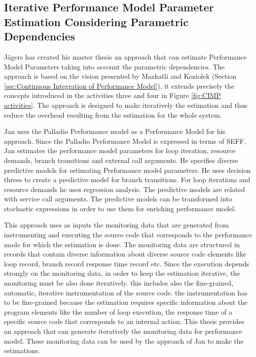 \subsection{Iterative Performance Model Parameter Estimation Considering Parametric Dependencies}
\label{sec:Iterative Performance Model Parameter Estimation Considering Parametric Dependencies}
Jägers has created his master thesis \cite{jagers2018Iterative} an approach that can estimate Performance Model Parameters taking into account the parametric dependencies. The approach is based on the vision presented by Mazkatli and Koziolek (Section \ref{sec:Continuous Integration of Performance Model}), it extends precisely the concepts introduced in the activities three and four in Figure \ref{fig:CIMP activities}. The approach is designed to make iteratively the estimation and thus reduce the overhead resulting from the estimation for the whole system. 

Jan uses the Palladio Performance model as a Performance Model for his approach. Since the Palladio Performance Model is expressed in terms of SEFF, Jan estimates the performance model parameters for loop iteration, resource demands, branch transitions and external call arguments. He specifies diverse predictive models for estimating Performance model parameters. He uses decision threes to create a predictive model for branch transitions. For loop iterations and resource demands he uses regression analysis. The predictive models are related with service call arguments. The predictive models can be transformed into stochastic expressions in order to use them for enriching performance model.

This approach uses as inputs the monitoring data that are generated from instrumenting and executing the source code that corresponds to the performance mode for which the estimation is done. The monitoring data are structured in records that contain diverse information about diverse source code elements like loop record, branch record response time record etc. Since the execution depends strongly on the monitoring data, in order to keep the estimation iterative, the monitoring must be also done iteratively. this includes also the fine-grained, automatic, iterative instrumentation of the source code. the instrumentation has to be fine-grained because the estimation requires specific information about the program elements like the number of loop execution, the response time of a specific source code that corresponds to an internal action. This thesis provides an approach that can generate iteratively the monitoring data for performance model. These monitoring data can be used by the approach of Jan to make the estimations.







